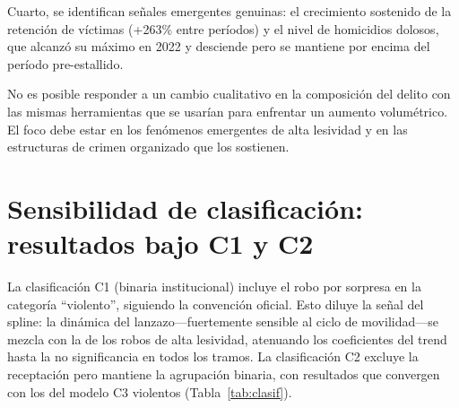 \documentclass[12pt,a4paper]{article}
\begin{document}
Cuarto, se identifican se\~nales emergentes genuinas: el crecimiento sostenido de
la retenci\'on de v\'ictimas (+263\% entre per\'iodos) y el nivel de homicidios
dolosos, que alcanz\'o su m\'aximo en 2022 y desciende pero se mantiene por encima del
per\'iodo pre-estallido.

No es posible responder a un cambio cualitativo en la composici\'on del delito con las
mismas herramientas que se usar\'ian para enfrentar un aumento volum\'etrico. El foco
debe estar en los fen\'omenos emergentes de alta lesividad y en las estructuras de
crimen organizado que los sostienen.


\newpage




\newpage
\appendix

\section{Sensibilidad de clasificaci\'on: resultados bajo C1 y C2}
\label{ap:clasif}

La clasificaci\'on C1 (binaria institucional) incluye el robo por sorpresa
en la categor\'ia ``violento'', siguiendo la convenci\'on oficial. Esto diluye la
se\~nal del spline: la din\'amica del lanzazo---fuertemente sensible al ciclo de
movilidad---se mezcla con la de los robos de alta lesividad, atenuando los coeficientes
del trend hasta la no significancia en todos los tramos. La clasificaci\'on C2 excluye
la receptaci\'on pero mantiene la agrupaci\'on binaria, con resultados que convergen
con los del modelo C3 violentos (Tabla~\ref{tab:clasif}).
\end{document}
